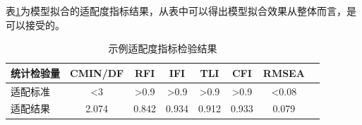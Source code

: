 表\ref{tab-3-5}为模型拟合的适配度指标结果，从表中可以得出模型拟合效果从整体而言，是可以接受的。


\begin{table}[!ht]
	\centering
	\renewcommand\arraystretch{1.3}
	\caption{示例适配度指标检验结果}
	\begin{tabular}{|l|c|c|c|c|c|c|c|}
		\hline
		\textbf{统计检验量} &  \textbf{CMIN/DF} & \textbf{RFI} & \textbf{IFI} & \textbf{TLI} & \textbf{CFI} & \textbf{RMSEA} \\
		\hline
		适配标准  & <3 & >0.9 & >0.9 & >0.9 & >0.9 & <0.08 \\
		\hline
		适配结果 & 2.074 & 0.842 & 0.934 & 0.912 & 0.933 & 0.079   \\
		\hline
	\end{tabular}
	\label{tab-3-5}
\end{table}

